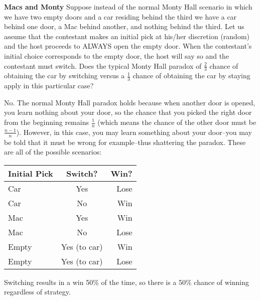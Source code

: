 \question \textbf{Macs and Monty} \newline
Suppose instead of the normal Monty Hall scenario in which we have two 
empty doors and a car residing behind the third we have a car behind 
one door, a Mac behind another, and nothing behind the third. \newline
Let us assume that the contestant makes an initial pick at his/her 
discretion (random) and the host proceeds to ALWAYS open the empty door. 
When the contestant's initial choice corresponds to the empty door, 
the host will say so and the contestant must switch. \newline
Does the typical Monty Hall paradox of $\frac{2}{3}$ chance of obtaining 
the car by switching versus a $\frac{1}{3}$ chance of obtaining the car 
by staying apply in this particular case?

\begin{solution}[7 cm]
No. The normal Monty Hall paradox holds because when another door is 
opened, you learn nothing about your door, so the chance that you 
picked the right door from the beginning remains $\frac{1}{n}$ (which 
means the chance of the other door must be $\frac{n-1}{n}$). However, 
in this case, you may learn something about your door--you may be told 
that it must be wrong for example--thus shattering the paradox. 
These are all of the possible scenarios: \newline

\begin{center}
\begin{tabular}{l | c || r}
\hline
Initial Pick & Switch? & Win? \\
\hline
Car & Yes & Lose \\
Car & No & Win \\
Mac & Yes & Win \\
Mac & No & Lose \\
Empty & Yes (to car) & Win \\
Empty & Yes (to car) & Lose \\
\hline
\end{tabular}
\end{center}
Switching results in a win 50\% of the time, so there is a 50\% chance 
of winning regardless of strategy.
 \end{solution}